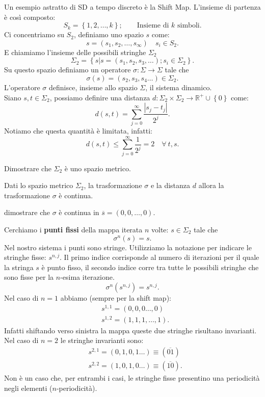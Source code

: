 \begin{exmp}
    Un esempio astratto di SD a tempo discreto è la Shift Map. L'insieme di partenza è così composto:
    \[
	S_k = \left\{1, 2, \ldots, k\right\}; \qquad \text{Insieme di $k$ simboli}
    .\] 
    Ci concentriamo su $S_2$, definiamo uno spazio $s$ come:
    \[
        s = \left(s_1, s_2, \ldots, s_{\infty}\right) \quad s_i \in S_2
    .\] 
    E chiamiamo l'insieme delle possibili stringhe $\Sigma_2$ 
    \[
        \Sigma_2 = \left\{s | s = \left(s_1, s_2 , s_3, \ldots\right); s_i \in \Sigma_2\right\}
    .\] 
    Su questo spazio definiamo un operatore $\sigma: \Sigma\to \Sigma$ tale che
    \[
	\sigma (s) = \left(s_2, s_3, s_4\ldots\right) \in \Sigma_2
    .\] 
    L'operatore $\sigma$ definisce, insieme allo spazio $\Sigma$,  il sistema dinamico.\\
    Siano $s, t \in \Sigma_2$, possiamo definire una distanza $d: \Sigma_2\times \Sigma_2\to \mathbb{R}^+ \cup \left\{0\right\}$ come:
    \[
	d(s, t) = \sum_{j=0}^{\infty} \frac{\left|s_j-t_j\right|}{2^j}
    .\] 
    Notiamo che questa quantità è limitata, infatti:
    \[
	d(s, t) \le \sum_{j=0}^{\infty} \frac{1}{2^j} = 2 \quad \forall \ t, s
    .\] 
    \begin{ex}
	Dimostrare che $\Sigma_2$ è uno spazio metrico.
    \end{ex}
    \noindent	
    \begin{thm}
	Dati lo spazio metrico $\Sigma_2$, la trasformazione $\sigma$ e la distanza $d$ allora la trasformazione $\sigma$ è continua.
    \end{thm}
    \noindent
    \begin{ex}
	dimostrare che $\sigma$ è continua in $\overline{s}=(0, 0, \ldots, 0)$.
    \end{ex}
    \noindent
    Cerchiamo i \textbf{punti fissi} della mappa iterata $n$ volte: $s \in \Sigma_2$ tale che
    \[
	\sigma^n(s) = s
    .\] 
    Nel nostro sistema i punti sono stringe. Utilizziamo la notazione per indicare le stringhe fisse: $s^{n, j}$. Il primo indice corrisponde al numero di iterazioni per il quale la stringa $s$ è punto fisso, il secondo indice corre tra tutte le possibili stringhe che sono fisse per la $n$-esima iterazione.
    \[
	\sigma^n(s^{n,j}) = s^{n,j} 
    .\] 
    Nel caso di $n=1$ abbiamo (sempre per la shift map):
    \[\begin{aligned}
	&s^{1,1} = (0,0,0\ldots,0)\\
	&s^{1,2} = (1,1,1,\ldots,1)
    .\end{aligned}\]
    Infatti shiftando verso sinistra la mappa queste due stringhe risultano invarianti.\\
    Nel caso di $n=2$  le stringhe invarianti sono:
    \[\begin{aligned}
	&s^{2,1} = (0,1,0,1\ldots) \equiv (\overline{01})\\
	&s^{2,2} = (1,0,1,0\ldots) \equiv (\overline{10})
    .\end{aligned}\]
    Non è un caso che, per entrambi i casi, le stringhe fisse presentino una periodicità negli elementi ($n$-periodicità).
\end{exmp}
\noindent
